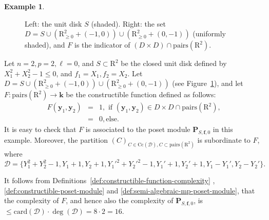 \documentclass{amsart}[10pts]
\theoremstyle{definition}
\newtheorem{example}{Example}[section]
\theoremstyle{remark}
\theoremstyle{observation}
\numberwithin{equation}{section}
\newcommand {\R} {\mathrm{R}}
\newcommand{\card}{\mathrm{card}}
\newcommand{\y}{\mathbf{y}}
\newcommand{\Cc}{\mathrm{Cc}}
\newcommand{\Pairs}{\mathrm{pairs}}
\begin{document}
\begin{example}
\begin{figure}[t]
\caption{Left: the unit disk $S$ (shaded). Right: the set $D=S\cup(\R_{\ge0}^2+(-1,0))\cup(\R_{\ge0}^2+(0,-1))$ (uniformly shaded), and $F$ is the indicator of $(D\times D)\cap \Pairs(\R^2)$.}
\label{fig:example}
\end{figure}




    Let $n=2,p = 2,\ell = 0$, and $S \subset \R^2$ be the closed unit disk defined by $X_1^2 + X_2^2 -1 \leq 0$, and 
    $f_1 = X_1,f_2 = X_2$. %
    Let $D =  S \cup (\R_{\geq 0}^2 + (-1,0))  \cup (\R_{\geq 0}^2 + (0,-1))$ (see Figure~\ref{fig:example}), 
and let $F: \Pairs(\R^2) \rightarrow \mathbf{k}$ be the constructible function defined as follows:
\begin{eqnarray*}
    F(\y_1,\y_2) &=& 1, \mbox{ if $(\y_1,\y_2) \in D \times D \cap \Pairs(\R^2)$,}\\
    &=& 0, \mbox{else}.
\end{eqnarray*}
It is easy to check that $F$ is associated to the poset module 
$\mathbf{P}_{S,\mathbf{f},0}$ in this example.
Moreover, 
the partition $(C)_{C\in \Cc(\mathcal{D}), C \subset \Pairs(\R^2)}$ is subordinate to $F$,
where 
\[
\mathcal{D} = \{ Y_1^2 + Y_2^2 -1, Y_1+1, Y_2+1, 
Y_1'^2 + Y_2'^2 -1, Y_1'+1, Y_2' +1, Y_1 - Y_1',Y_2 - Y_2'\}.
\]

It follows from Definitions~\ref{def:constructible-function-complexity}
, \ref{def:constructible-poset-module} and \ref{def:semi-algebraic-mp-poset-module}, 
that
the complexity of $F$, and hence also the complexity of $\mathbf{P}_{S,\mathbf{f},0}$, is
$\leq \card(\mathcal{D})\cdot \deg(\mathcal{D}) = 8 \cdot 2  = 16$.
\end{example}
\end{document}
